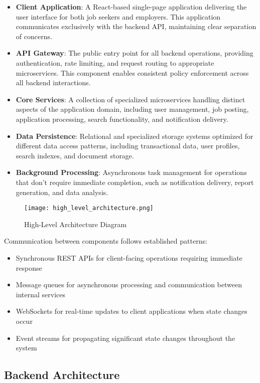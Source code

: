 \documentclass[12pt,a4paper]{article}
\begin{document}
\begin{itemize}
    \item \textbf{Client Application}: A React-based single-page application delivering the user interface for both job seekers and employers. This application communicates exclusively with the backend API, maintaining clear separation of concerns.
    \item \textbf{API Gateway}: The public entry point for all backend operations, providing authentication, rate limiting, and request routing to appropriate microservices. This component enables consistent policy enforcement across all backend interactions.
    \item \textbf{Core Services}: A collection of specialized microservices handling distinct aspects of the application domain, including user management, job posting, application processing, search functionality, and notification delivery.
    \item \textbf{Data Persistence}: Relational and specialized storage systems optimized for different data access patterns, including transactional data, user profiles, search indexes, and document storage.
    \item \textbf{Background Processing}: Asynchronous task management for operations that don't require immediate completion, such as notification delivery, report generation, and data analysis.
\end{itemize}

\begin{figure}[H]
\centering
\texttt{[image: high\_level\_architecture.png]}
\caption{High-Level Architecture Diagram}
\label{fig:high-level-architecture}
\end{figure}

Communication between components follows established patterns:
\begin{itemize}
    \item Synchronous REST APIs for client-facing operations requiring immediate response
    \item Message queues for asynchronous processing and communication between internal services
    \item WebSockets for real-time updates to client applications when state changes occur
    \item Event streams for propagating significant state changes throughout the system
\end{itemize}

\subsection{Backend Architecture}
\end{document}
